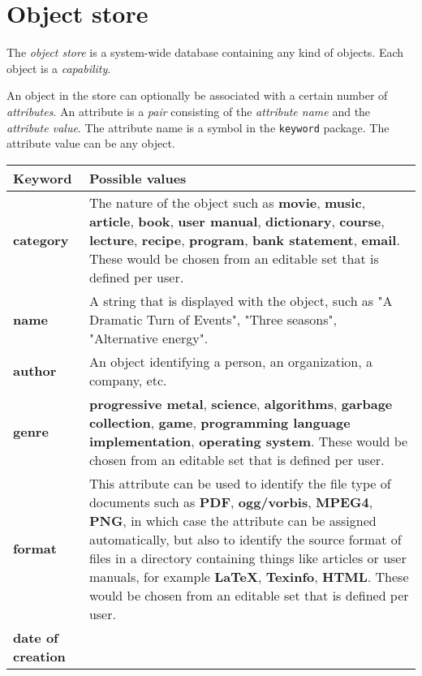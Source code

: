 \chapter{Object store}
\label{chap-object-store}

The \emph{object store} is a system-wide database containing
any kind of objects.  Each object is a \emph{capability}. 

An object in the store can optionally be associated with a certain
number of \emph{attributes}.  An attribute is a \emph{pair} consisting
of the \emph{attribute name} and the \emph{attribute value}.  The
attribute name is a symbol in the \texttt{keyword} package.  The
attribute value can be any object. 

\begin{tabularx}{\linewidth}%
{|>{\setlength\hsize{.2\hsize}}X|%
  >{\setlength\hsize{.8\hsize}}X|}
\hline
Keyword & Possible values\\
\hline\hline
\textbf{category} &

The nature of the object such
as \textbf{movie}, \textbf{music}, \textbf{article}, \textbf{book}, \textbf{user
manual}, \textbf{dictionary}, \textbf{course}, \textbf{lecture},
\textbf{recipe}, \textbf{program}, \textbf{bank statement},
\textbf{email}.  These would be chosen from an
editable set that is defined per user.\\
\hline
\textbf{name} &

A string that is displayed with the object, such as "A Dramatic
Turn of Events", "Three seasons", "Alternative energy".\\
\hline
\textbf{author} &

An object identifying a person, an organization, a company,
etc. \\
\hline
\textbf{genre} &

\textbf{progressive
metal}, \textbf{science}, \textbf{algorithms}, \textbf{garbage
collection}, \textbf{game}, \textbf{programming language
implementation}, \textbf{operating system}.  These would be
chosen from an editable set that is defined per user.\\
\hline
\textbf{format} &

This attribute can be used to identify the file type of documents such
as \textbf{PDF}, \textbf{ogg/vorbis}, \textbf{MPEG4}, \textbf{PNG}, in
which case the attribute can be assigned automatically, but also to
identify the source format of files in a directory containing
things like articles or user manuals, for
example \textbf{LaTeX}, \textbf{Texinfo}, \textbf{HTML}.  These would
be chosen from an editable set that is defined per user. \\
\hline
\textbf{date of creation} &


\end{tabularx}
